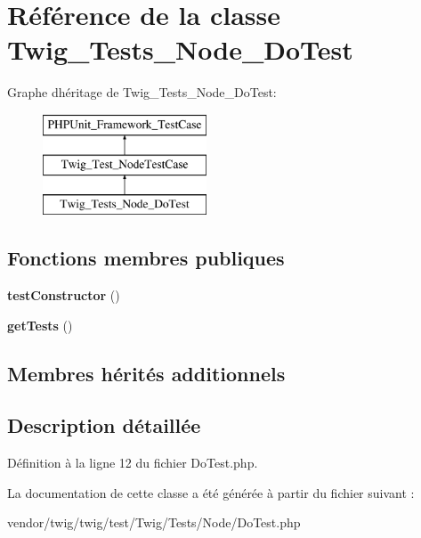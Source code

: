 \hypertarget{class_twig___tests___node___do_test}{}\section{Référence de la classe Twig\+\_\+\+Tests\+\_\+\+Node\+\_\+\+Do\+Test}
\label{class_twig___tests___node___do_test}
Graphe d\textquotesingle{}héritage de Twig\+\_\+\+Tests\+\_\+\+Node\+\_\+\+Do\+Test\+:\begin{figure}[H]
\begin{center}
\leavevmode
\includegraphics[height=3.000000cm]{class_twig___tests___node___do_test}
\end{center}
\end{figure}
\subsection*{Fonctions membres publiques}
\begin{DoxyCompactItemize}
\item 
{\bfseries test\+Constructor} ()\hypertarget{class_twig___tests___node___do_test_a47094dc941e72950570900d1418f89c6}{}\label{class_twig___tests___node___do_test_a47094dc941e72950570900d1418f89c6}

\item 
{\bfseries get\+Tests} ()\hypertarget{class_twig___tests___node___do_test_a7e247dd31cc8d37a6c97353a062a0080}{}\label{class_twig___tests___node___do_test_a7e247dd31cc8d37a6c97353a062a0080}

\end{DoxyCompactItemize}
\subsection*{Membres hérités additionnels}


\subsection{Description détaillée}


Définition à la ligne 12 du fichier Do\+Test.\+php.



La documentation de cette classe a été générée à partir du fichier suivant \+:\begin{DoxyCompactItemize}
\item 
vendor/twig/twig/test/\+Twig/\+Tests/\+Node/Do\+Test.\+php\end{DoxyCompactItemize}
